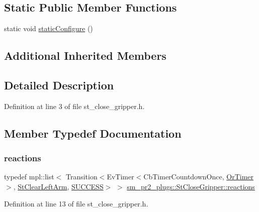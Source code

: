 \subsection*{Static Public Member Functions}
\begin{DoxyCompactItemize}
\item 
static void \hyperlink{structsm__pr2__plugs_1_1StCloseGripper_a72d68b4e2478674f5022f93ce881bbd6}{static\+Configure} ()
\end{DoxyCompactItemize}
\subsection*{Additional Inherited Members}


\subsection{Detailed Description}


Definition at line 3 of file st\+\_\+close\+\_\+gripper.\+h.



\subsection{Member Typedef Documentation}
\mbox{\label{structsm__pr2__plugs_1_1StCloseGripper_a0ad3f271dea7b36dc6ac599b9818bb77}} 
\subsubsection{\texorpdfstring{reactions}{reactions}}
{\footnotesize\ttfamily typedef mpl\+::list$<$ Transition$<$Ev\+Timer$<$Cb\+Timer\+Countdown\+Once, \hyperlink{classsm__pr2__plugs_1_1OrTimer}{Or\+Timer}$>$, \hyperlink{structsm__pr2__plugs_1_1StClearLeftArm}{St\+Clear\+Left\+Arm}, \hyperlink{classSUCCESS}{S\+U\+C\+C\+E\+SS}$>$ $>$ \hyperlink{structsm__pr2__plugs_1_1StCloseGripper_a0ad3f271dea7b36dc6ac599b9818bb77}{sm\+\_\+pr2\+\_\+plugs\+::\+St\+Close\+Gripper\+::reactions}}



Definition at line 13 of file st\+\_\+close\+\_\+gripper.\+h.



